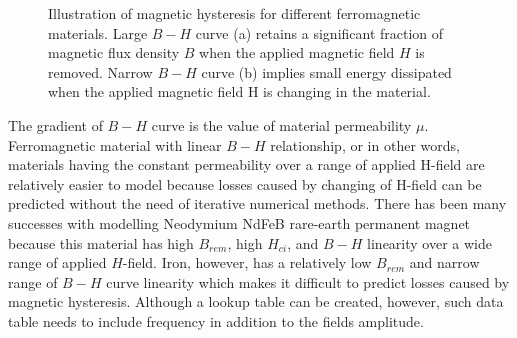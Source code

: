         
        \begin{figure}[!ht]
            \centering
            \qquad
            \caption{
                Illustration of magnetic hysteresis for different ferromagnetic materials. Large $B-H$ curve (a) retains a significant fraction of magnetic flux density $B$ when the applied magnetic field $H$ is removed. Narrow $B-H$ curve (b) implies small energy dissipated when the applied magnetic field H is changing in the material.
            }   \label{fig:chapter/background/bh loop}
        \end{figure}
        
        
        The gradient of $B-H$ curve is the value of material permeability $\mu$. Ferromagnetic material with linear $B-H$ relationship, or in other words, materials having the constant permeability over a range of applied H-field are relatively easier to model because losses caused by changing of H-field can be predicted without the need of iterative numerical methods. There has been many successes with modelling Neodymium NdFeB rare-earth permanent magnet because this material has high $B_{rem}$, high $H_{ci}$, and $B-H$ linearity over a wide range of applied $H$-field. Iron, however, has a relatively low $B_{rem}$ and narrow range of $B-H$ curve linearity which makes it difficult to predict losses caused by magnetic hysteresis. Although a lookup table can be created, however, such data table needs to include frequency in addition to the fields amplitude. 
        
